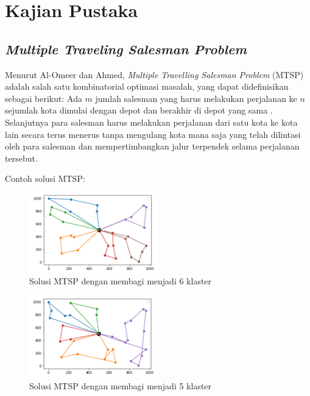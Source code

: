 
\section{Kajian Pustaka}

\subsection{\textit{Multiple Traveling Salesman Problem}}

Menurut Al-Omeer dan Ahmed, \textit{Multiple Travelling Salesman Problem} (MTSP) adalah salah satu kombinatorial optimasi masalah, yang dapat didefinisikan sebagai berikut: Ada $m$ jumlah salesman yang harus melakukan perjalanan ke $n$ sejumlah kota dimulai dengan depot dan berakhir di depot yang sama \cite{al2019comparative}. Selanjutnya para salesman harus melakukan perjalanan dari satu kota ke kota lain secara terus menerus tanpa mengulang kota mana saja yang telah dilintasi oleh para salesman dan mempertimbangkan jalur terpendek selama perjalanan tersebut.

Contoh solusi MTSP:

\begin{figure}[h!]
  \centering
  \includegraphics[width=0.5\textwidth]{Picture1.png}
  \caption{Solusi MTSP dengan membagi menjadi 6 klaster}
\end{figure}

\begin{figure}[h!]
  \centering
  \includegraphics[width=0.5\textwidth]{Picture2.png}
  \caption{Solusi MTSP dengan membagi menjadi 5 klaster}
\end{figure}

